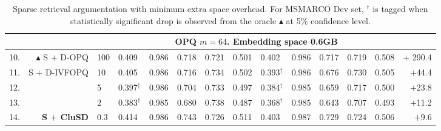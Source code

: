 \begin{table*}[htbp]
{\begin{tabular}{ r r l |l l ll l |llll l|r}
           & & & \multicolumn{10}{c}{\bf{OPQ $m=64$. Embedding space 0.6GB}}\\
            \hline
           10. & $\blacktriangle$  S $+$ D-OPQ  &100 & 0.409 & 0.986 & 0.718 &  0.721  &0.501 & 0.402 & 0.986 & 0.717 &  0.719 & 0.508 &$+$ 290.4 \\
           11. &   S $+$ D-IVFOPQ &10& 0.405 & 0.986 & 0.716 & 0.734 & 0.502 & 0.393$^\dag$& 0.986& 0.676&0.730& 0.505& $+$44.4 \\
           12. &   &5& 0.397$^\dag$& 0.986 & 0.704 & 0.733  & 0.497 & 0.384$^\dag$& 0.985& 0.659&0.717& 0.500& $+$23.8 \\ 
            13. &  &2& 0.383$^\dag$& 0.985 & 0.680 & 0.738 & 0.487 & 0.368$^\dag$& 0.985 & 0.643&0.707& 0.493 & $+$11.2 \\
            14. &  \textbf{S $+$ CluSD}  &0.3& 0.414 & 0.986 & 0.743& 0.726 & 0.511 & 0.403 & 0.987& 0.729&0.724 & 0.506 & $+$9.6 \\
              \hline\hline
		\end{tabular}
		}
	\caption{
Sparse retrieval argumentation with minimum extra space overhead.
For MSMARCO Dev set, $^\dag$ is tagged when statistically significant drop is observed from the oracle $\blacktriangle$ at 5\% confidence level. 
}
\vspace*{-5mm}
	\label{tab:mainspace}
\end{table*}



